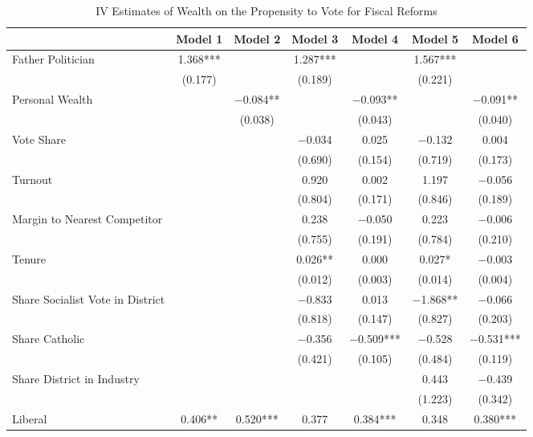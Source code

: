 \begin{table}

\caption{\label{tab:ivresults_fisc_log}IV Estimates of Wealth on the Propensity to Vote for Fiscal Reforms}
\centering
\begin{tabular}[t]{lcccccc}
\toprule
  & Model 1 & Model 2 & Model 3 & Model 4 & Model 5 & Model 6\\
\midrule
Father Politician & \num{1.368}*** &  & \num{1.287}*** &  & \num{1.567}*** & \\
 & (\num{0.177}) &  & (\num{0.189}) &  & (\num{0.221}) & \\
Personal Wealth &  & \num{-0.084}** &  & \num{-0.093}** &  & \num{-0.091}**\\
 &  & (\num{0.038}) &  & (\num{0.043}) &  & (\num{0.040})\\
Vote Share &  &  & \num{-0.034} & \num{0.025} & \num{-0.132} & \num{0.004}\\
 &  &  & (\num{0.690}) & (\num{0.154}) & (\num{0.719}) & (\num{0.173})\\
Turnout &  &  & \num{0.920} & \num{0.002} & \num{1.197} & \num{-0.056}\\
 &  &  & (\num{0.804}) & (\num{0.171}) & (\num{0.846}) & (\num{0.189})\\
Margin to Nearest Competitor &  &  & \num{0.238} & \num{-0.050} & \num{0.223} & \num{-0.006}\\
 &  &  & (\num{0.755}) & (\num{0.191}) & (\num{0.784}) & (\num{0.210})\\
Tenure &  &  & \num{0.026}** & \num{0.000} & \num{0.027}* & \num{-0.003}\\
 &  &  & (\num{0.012}) & (\num{0.003}) & (\num{0.014}) & (\num{0.004})\\
Share Socialist Vote in District &  &  & \num{-0.833} & \num{0.013} & \num{-1.868}** & \num{-0.066}\\
 &  &  & (\num{0.818}) & (\num{0.147}) & (\num{0.827}) & (\num{0.203})\\
Share Catholic &  &  & \num{-0.356} & \num{-0.509}*** & \num{-0.528} & \num{-0.531}***\\
 &  &  & (\num{0.421}) & (\num{0.105}) & (\num{0.484}) & (\num{0.119})\\
Share District in Industry &  &  &  &  & \num{0.443} & \num{-0.439}\\
 &  &  &  &  & (\num{1.223}) & (\num{0.342})\\
Liberal & \num{0.406}** & \num{0.520}*** & \num{0.377} & \num{0.384}*** & \num{0.348} & \num{0.380}***\\

\end{tabular}
\end{table}
